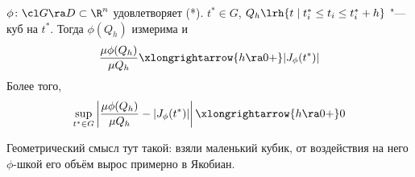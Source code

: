 \begin{theorem}
	$\phi\colon \cl G \ra D \subset \R^n$ удовлетворяет (*).
	$t^* \in G$, $Q_h \lrh \{t \mid t^*_i \le t_i \le t^*_i + h\}$ "--- куб на $t^*$.
	Тогда $\phi(Q_h)$ измерима и
	\[
		\frac{\mu \phi(Q_h)}{\mu Q_h} \xlongrightarrow{h \ra 0+} |J_\phi(t^*)|
	\]
	Более того,
	\[
		\sup_{t^* \in G} \left| \frac{\mu \phi(Q_h)}{\mu Q_h} - |J_\phi(t^*)|\right| \xlongrightarrow{h \ra 0+} 0
	\]
\end{theorem}
\begin{Rem}
	Геометрический смысл тут такой: взяли маленький кубик, от воздействия на него $\phi$-шкой его объём вырос примерно в Якобиан.
\end{Rem}
